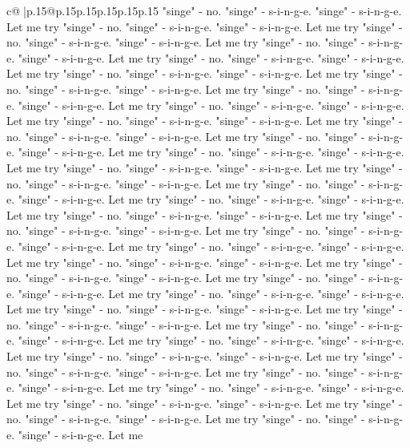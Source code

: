 \documentclass{article}
\begin{document}
{\begin{supertabular}{c@{$\;$}|p{.15\linewidth}@{}p{.15\linewidth}p{.15\linewidth}p{.15\linewidth}p{.15\linewidth}p{.15\linewidth}}
{{{"singe" {-} no. "singe" {-} s{-}i{-}n{-}g{-}e. "singe" {-} s{-}i{-}n{-}g{-}e. Let me try "singe" {-} no. "singe" {-} s{-}i{-}n{-}g{-}e. "singe" {-} s{-}i{-}n{-}g{-}e. Let me try "singe" {-} no. "singe" {-} s{-}i{-}n{-}g{-}e. "singe" {-} s{-}i{-}n{-}g{-}e. Let me try "singe" {-} no. "singe" {-} s{-}i{-}n{-}g{-}e. "singe" {-} s{-}i{-}n{-}g{-}e. Let me try "singe" {-} no. "singe" {-} s{-}i{-}n{-}g{-}e. "singe" {-} s{-}i{-}n{-}g{-}e. Let me try "singe" {-} no. "singe" {-} s{-}i{-}n{-}g{-}e. "singe" {-} s{-}i{-}n{-}g{-}e. Let me try "singe" {-} no. "singe" {-} s{-}i{-}n{-}g{-}e. "singe" {-} s{-}i{-}n{-}g{-}e. Let me try "singe" {-} no. "singe" {-} s{-}i{-}n{-}g{-}e. "singe" {-} s{-}i{-}n{-}g{-}e. Let me try "singe" {-} no. "singe" {-} s{-}i{-}n{-}g{-}e. "singe" {-} s{-}i{-}n{-}g{-}e. Let me try "singe" {-} no. "singe" {-} s{-}i{-}n{-}g{-}e. "singe" {-} s{-}i{-}n{-}g{-}e. Let me try "singe" {-} no. "singe" {-} s{-}i{-}n{-}g{-}e. "singe" {-} s{-}i{-}n{-}g{-}e. Let me try "singe" {-} no. "singe" {-} s{-}i{-}n{-}g{-}e. "singe" {-} s{-}i{-}n{-}g{-}e. Let me try "singe" {-} no. "singe" {-} s{-}i{-}n{-}g{-}e. "singe" {-} s{-}i{-}n{-}g{-}e. Let me try "singe" {-} no. "singe" {-} s{-}i{-}n{-}g{-}e. "singe" {-} s{-}i{-}n{-}g{-}e. Let me try "singe" {-} no. "singe" {-} s{-}i{-}n{-}g{-}e. "singe" {-} s{-}i{-}n{-}g{-}e. Let me try "singe" {-} no. "singe" {-} s{-}i{-}n{-}g{-}e. "singe" {-} s{-}i{-}n{-}g{-}e. Let me try "singe" {-} no. "singe" {-} s{-}i{-}n{-}g{-}e. "singe" {-} s{-}i{-}n{-}g{-}e. Let me try "singe" {-} no. "singe" {-} s{-}i{-}n{-}g{-}e. "singe" {-} s{-}i{-}n{-}g{-}e. Let me try "singe" {-} no. "singe" {-} s{-}i{-}n{-}g{-}e. "singe" {-} s{-}i{-}n{-}g{-}e. Let me try "singe" {-} no. "singe" {-} s{-}i{-}n{-}g{-}e. "singe" {-} s{-}i{-}n{-}g{-}e. Let me try "singe" {-} no. "singe" {-} s{-}i{-}n{-}g{-}e. "singe" {-} s{-}i{-}n{-}g{-}e. Let me try "singe" {-} no. "singe" {-} s{-}i{-}n{-}g{-}e. "singe" {-} s{-}i{-}n{-}g{-}e. Let me try "singe" {-} no. "singe" {-} s{-}i{-}n{-}g{-}e. "singe" {-} s{-}i{-}n{-}g{-}e. Let me try "singe" {-} no. "singe" {-} s{-}i{-}n{-}g{-}e. "singe" {-} s{-}i{-}n{-}g{-}e. Let me try "singe" {-} no. "singe" {-} s{-}i{-}n{-}g{-}e. "singe" {-} s{-}i{-}n{-}g{-}e. Let me try "singe" {-} no. "singe" {-} s{-}i{-}n{-}g{-}e. "singe" {-} s{-}i{-}n{-}g{-}e. Let me try "singe" {-} no. "singe" {-} s{-}i{-}n{-}g{-}e. "singe" {-} s{-}i{-}n{-}g{-}e. Let me try "singe" {-} no. "singe" {-} s{-}i{-}n{-}g{-}e. "singe" {-} s{-}i{-}n{-}g{-}e. Let me try "singe" {-} no. "singe" {-} s{-}i{-}n{-}g{-}e. "singe" {-} s{-}i{-}n{-}g{-}e. Let me try "singe" {-} no. "singe" {-} s{-}i{-}n{-}g{-}e. "singe" {-} s{-}i{-}n{-}g{-}e. Let me try "singe" {-} no. "singe" {-} s{-}i{-}n{-}g{-}e. "singe" {-} s{-}i{-}n{-}g{-}e. Let me try "singe" {-} no. "singe" {-} s{-}i{-}n{-}g{-}e. "singe" {-} s{-}i{-}n{-}g{-}e. Let me try "singe" {-} no. "singe" {-} s{-}i{-}n{-}g{-}e. "singe" {-} s{-}i{-}n{-}g{-}e. Let me try "singe" {-} no. "singe" {-} s{-}i{-}n{-}g{-}e. "singe" {-} s{-}i{-}n{-}g{-}e. Let me try "singe" {-} no. "singe" {-} s{-}i{-}n{-}g{-}e. "singe" {-} s{-}i{-}n{-}g{-}e. Let me try "singe" {-} no. "singe" {-} s{-}i{-}n{-}g{-}e. "singe" {-} s{-}i{-}n{-}g{-}e. Let me }}}
\end{supertabular}}
\end{document}
